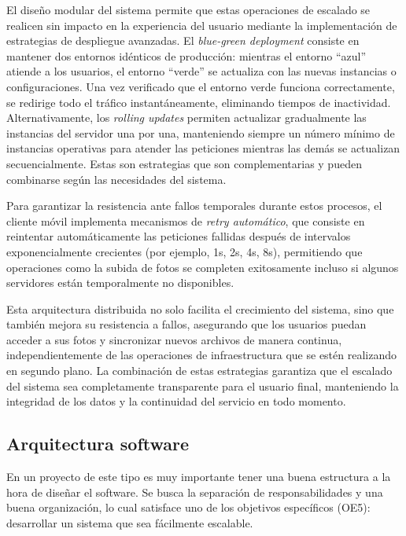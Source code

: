 El diseño modular del sistema permite que estas operaciones de escalado se realicen sin impacto en la experiencia del usuario mediante la implementación de estrategias de despliegue avanzadas. El \textit{blue-green deployment} consiste en mantener dos entornos idénticos de producción: mientras el entorno ``azul'' atiende a los usuarios, el entorno ``verde'' se actualiza con las nuevas instancias o configuraciones. Una vez verificado que el entorno verde funciona correctamente, se redirige todo el tráfico instantáneamente, eliminando tiempos de inactividad. Alternativamente, los \textit{rolling updates} permiten actualizar gradualmente las instancias del servidor una por una, manteniendo siempre un número mínimo de instancias operativas para atender las peticiones mientras las demás se actualizan secuencialmente. Estas son estrategias que son complementarias y pueden combinarse según las necesidades del sistema.

Para garantizar la resistencia ante fallos temporales durante estos procesos, el cliente móvil implementa mecanismos de \textit{retry automático}, que consiste en reintentar automáticamente las peticiones fallidas después de intervalos exponencialmente crecientes (por ejemplo, 1s, 2s, 4s, 8s), permitiendo que operaciones como la subida de fotos se completen exitosamente incluso si algunos servidores están temporalmente no disponibles.

Esta arquitectura distribuida no solo facilita el crecimiento del sistema, sino que también mejora su resistencia a fallos, asegurando que los usuarios puedan acceder a sus fotos y sincronizar nuevos archivos de manera continua, independientemente de las operaciones de infraestructura que se estén realizando en segundo plano. La combinación de estas estrategias garantiza que el escalado del sistema sea completamente transparente para el usuario final, manteniendo la integridad de los datos y la continuidad del servicio en todo momento.

\subsection{Arquitectura software}
En un proyecto de este tipo es muy importante tener una buena estructura a la hora de diseñar el software.
Se busca la separación de responsabilidades y una buena organización, lo cual satisface uno de los objetivos específicos (OE5): desarrollar un sistema que sea fácilmente escalable.

